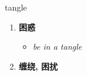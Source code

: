 
\begin{frame}
{\huge tangle}
\begin{center}
\begin{enumerate}\Large
  \item \textbf{困惑}
  \begin{itemize}
    \item \em{\Large{be in a tangle}}
  \end{itemize}
  \item \textbf{缠绕, 困扰}
\end{enumerate}
\end{center}
\end{frame}
